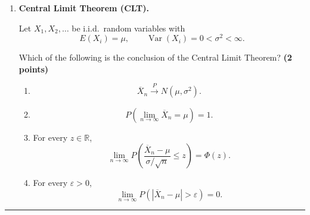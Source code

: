\documentclass[11pt]{article}
\begin{document}
\begin{enumerate}[label=(\alph*),leftmargin=*,itemsep=1.2em]
\begin{enumerate}[label=(\Alph*),leftmargin=2em,itemsep=0.5em]
    \item For every \(\varepsilon>0\),
    \[
    \lim_{n\to\infty}
    P\left(
    |\overline X_n-\mu|>\varepsilon
    \right)
    =0.
    \]

    \item
    \[
    \lim_{n\to\infty}
    P(\overline X_n=\mu)
    =1.
    \]

    \item
    \[
    \frac{\overline X_n-\mu}{\sigma/\sqrt n}
    \xrightarrow[]{d}
    N(0,1).
    \]

\end{enumerate}


\item \textbf{Central Limit Theorem (CLT).}

Let \(X_1,X_2,\ldots\) be i.i.d.\ random variables with
\[
E(X_i)=\mu,
\qquad
\operatorname{Var}(X_i)=0<\sigma^2<\infty.
\]

Which of the following is the conclusion of the Central Limit Theorem?
\hfill \textbf{(2 points)}

\begin{enumerate}[label=(\Alph*),leftmargin=2em,itemsep=0.5em]

    \item
    \[
    \overline X_n
    \xrightarrow[]{P}
    N(\mu,\sigma^2).
    \]

    \item
    \[
    P\left(
    \lim_{n\to\infty}\overline X_n=\mu
    \right)=1.
    \]

    \item For every \(z\in\mathbb R\),
    \[
    \lim_{n\to\infty}
    P\left(
    \frac{\overline X_n-\mu}{\sigma/\sqrt n}
    \leq z
    \right)
    =
    \Phi(z).
    \]

    \item For every \(\varepsilon>0\),
    \[
    \lim_{n\to\infty}
    P\left(
    |\overline X_n-\mu|>\varepsilon
    \right)
    =0.
    \]

\end{enumerate}

\end{enumerate}

\hrule
\end{document}
